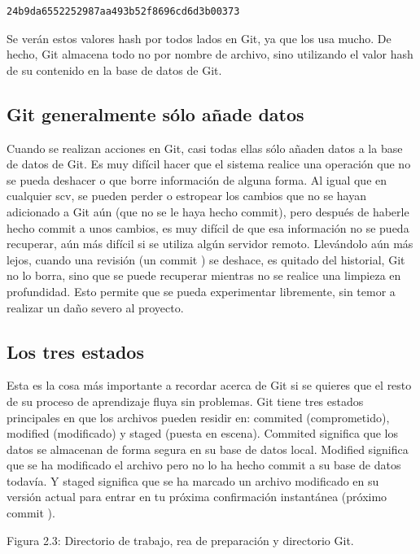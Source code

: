 \documentclass[12pt, spanish, oneside, onecolumn, a4paper]{report}
\begin{document}
\begin{verbatim}
24b9da6552252987aa493b52f8696cd6d3b00373
\end{verbatim}

Se verán estos valores hash por todos lados en Git, ya que los usa mucho. De hecho, Git almacena todo no por nombre de archivo, sino utilizando el valor hash de su contenido en la base de datos de Git.

\subsection{Git generalmente sólo añade datos}
\label{sec:addata}


Cuando se realizan acciones en Git, casi todas ellas sólo añaden datos a la base de datos de Git. Es muy difícil hacer que el sistema realice una operación que no se pueda deshacer o que borre información de alguna forma. Al igual que en cualquier \gls{scv}, se pueden perder o estropear los cambios que no se hayan adicionado a Git aún (que no se le haya hecho commit), pero después de haberle hecho commit a unos cambios, es muy difícil de que esa información no se pueda recuperar, aún más difícil si se utiliza algún servidor remoto. Llevándolo aún más lejos, cuando una revisión (un commit ) se deshace, es quitado del historial, Git no lo borra, sino que se puede recuperar mientras no se realice una limpieza en profundidad. Esto permite que se pueda experimentar libremente, sin temor a realizar un daño severo al proyecto.

\subsection{Los tres estados}
\label{sec:threestates}


Esta es la cosa más importante a recordar acerca de Git si se quieres que el resto de su proceso de aprendizaje fluya sin problemas. Git tiene tres estados principales en que los archivos pueden residir en: commited (comprometido), modified (modificado) y staged (puesta en escena). Commited significa que los datos se almacenan de forma segura en su base de datos local. Modified significa que se ha modificado el archivo pero no lo ha hecho commit a su base de datos todavía. Y staged significa que se ha marcado un archivo modificado en su versión actual para entrar en tu próxima confirmación instantánea (próximo commit ).

Figura 2.3: Directorio de trabajo, rea de preparación y directorio Git.
\end{document}
